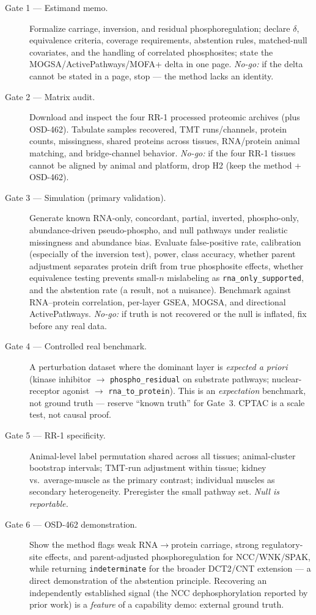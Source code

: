 \documentclass[11pt]{article}
\newcommand{\Ccar}{\texttt{rna\_to\_protein}}
\newcommand{\Crna}{\texttt{rna\_only\_supported}}
\newcommand{\Cpho}{\texttt{phospho\_residual}}
\newcommand{\Cind}{\texttt{indeterminate}}
\begin{document}
\begin{description}
\item[Gate 1 --- Estimand memo.] Formalize carriage, inversion, and residual phosphoregulation; declare
$\delta$, equivalence criteria, coverage requirements, abstention rules, matched-null covariates, and the
handling of correlated phosphosites; state the MOGSA/ActivePathways/MOFA+ delta in one page.
\emph{No-go:} if the delta cannot be stated in a page, stop --- the method lacks an identity.
\item[Gate 2 --- Matrix audit.] Download and inspect the four RR-1 processed proteomic archives (plus
OSD-462). Tabulate samples recovered, TMT runs/channels, protein counts, missingness, shared proteins
across tissues, RNA/protein animal matching, and bridge-channel behavior. \emph{No-go:} if the four RR-1
tissues cannot be aligned by animal and platform, drop H2 (keep the method + OSD-462).
\item[Gate 3 --- Simulation (primary validation).] Generate known RNA-only, concordant, partial, inverted,
phospho-only, abundance-driven pseudo-phospho, and null pathways under realistic missingness and abundance
bias. Evaluate false-positive rate, calibration (especially of the inversion test), power, class accuracy,
whether parent adjustment separates protein drift from true phosphosite effects, whether equivalence
testing prevents small-$n$ mislabeling as \Crna{}, and the abstention rate (a result, not a nuisance).
Benchmark against RNA--protein correlation, per-layer GSEA, MOGSA, and directional ActivePathways.
\emph{No-go:} if truth is not recovered or the null is inflated, fix before any real data.
\item[Gate 4 --- Controlled real benchmark.] A perturbation dataset where the dominant layer is
\emph{expected a priori} (kinase inhibitor $\rightarrow$ \Cpho{} on substrate pathways; nuclear-receptor
agonist $\rightarrow$ \Ccar{}). This is an \emph{expectation} benchmark, not ground truth --- reserve
``known truth'' for Gate~3. CPTAC is a scale test, not causal proof.
\item[Gate 5 --- RR-1 specificity.] Animal-level label permutation shared across all tissues;
animal-cluster bootstrap intervals; TMT-run adjustment within tissue; kidney vs.\ average-muscle as the
primary contrast; individual muscles as secondary heterogeneity. Preregister the small pathway set.
\emph{Null is reportable.}
\item[Gate 6 --- OSD-462 demonstration.] Show the method flags weak RNA$\rightarrow$protein carriage, strong
regulatory-site effects, and parent-adjusted phosphoregulation for NCC/WNK/SPAK, while returning
\Cind{} for the broader DCT2/CNT extension --- a direct demonstration of the abstention principle.
Recovering an independently established signal (the NCC dephosphorylation reported by prior work) is a
\emph{feature} of a capability demo: external ground truth.
\end{description}
\end{document}
